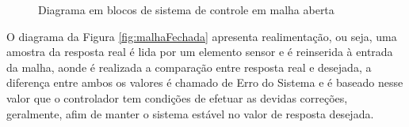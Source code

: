 \begin{figure}[!htb]
\centering
{}
\caption{ Diagrama em blocos de sistema de controle em malha aberta}
\label{fig:malhaAberta}
\end{figure}


O diagrama da Figura \ref{fig:malhaFechada} apresenta realimentação, ou seja, uma amostra da resposta real é lida por um elemento sensor e é reinserida à entrada da malha, aonde é realizada a comparação entre resposta real e desejada, a diferença entre ambos os valores é chamado de Erro do Sistema e é baseado nesse valor que o controlador tem condições de efetuar as devidas correções, geralmente, afim de manter o sistema estável no valor de resposta desejada.

